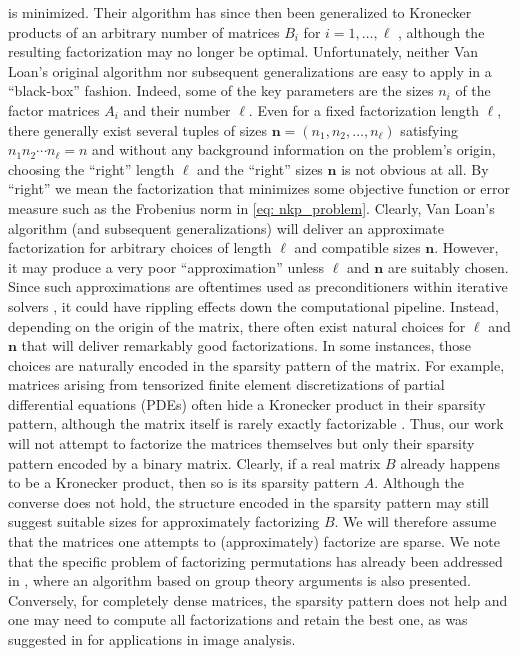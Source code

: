 \documentclass{article}
\numberwithin{equation}{section}
\theoremstyle{definition}
\begin{document}
is minimized. Their algorithm has since then been generalized to Kronecker products of an arbitrary number of matrices $B_i$ for $i=1,\dots,\ell$ \cite{langville2004akronecker}, although the resulting factorization may no longer be optimal. Unfortunately, neither Van Loan's original algorithm nor subsequent generalizations are easy to apply in a ``black-box'' fashion. Indeed, some of the key parameters are the sizes $n_i$ of the factor matrices $A_i$ and their number $\ell$. Even for a fixed factorization length $\ell$, there generally exist several tuples of sizes $\bm{n}=(n_1,n_2,\dots,n_\ell)$ satisfying $n_1n_2\cdots n_\ell=n$ and without any background information on the problem's origin, choosing the ``right'' length $\ell$ and the ``right'' sizes $\bm{n}$ is not obvious at all. By ``right'' we mean the factorization that minimizes some objective function or error measure such as the Frobenius norm in \eqref{eq: nkp_problem}. Clearly, Van Loan's algorithm (and subsequent generalizations) will deliver an approximate factorization for arbitrary choices of length $\ell$ and compatible sizes $\bm{n}$. However, it may produce a very poor ``approximation'' unless $\ell$ and $\bm{n}$ are suitably chosen. Since such approximations are oftentimes used as preconditioners within iterative solvers \cite{van1993approximation,langville2004akronecker,nagy2006kronecker,voet2025preconditioning}, it could have rippling effects down the computational pipeline. Instead, depending on the origin of the matrix, there often exist natural choices for $\ell$ and $\bm{n}$ that will deliver remarkably good factorizations. In some instances, those choices are naturally encoded in the sparsity pattern of the matrix. For example, matrices arising from tensorized finite element discretizations of partial differential equations (PDEs) often hide a Kronecker product in their sparsity pattern, although the matrix itself is rarely exactly factorizable \cite{hofreither2018black,voet2025mass}. Thus, our work will not attempt to factorize the matrices themselves but only their sparsity pattern encoded by a binary matrix. Clearly, if a real matrix $B$ already happens to be a Kronecker product, then so is its sparsity pattern $A$. Although the converse does not hold, the structure encoded in the sparsity pattern may still suggest suitable sizes for approximately factorizing $B$. We will therefore assume that the matrices one attempts to (approximately) factorize are sparse. We note that the specific problem of factorizing permutations has already been addressed in \cite{egner1997decomposing}, where an algorithm based on group theory arguments is also presented. Conversely, for completely dense matrices, the sparsity pattern does not help and one may need to compute all factorizations and retain the best one, as was suggested in \cite{cai2022kopa} for applications in image analysis.
\end{document}
